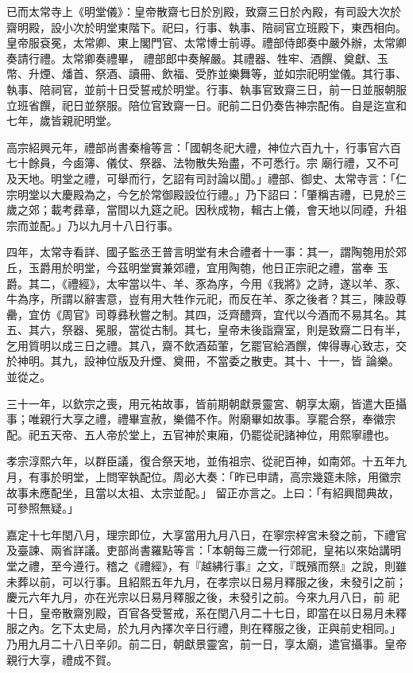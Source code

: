 \begin{pinyinscope}
 已而太常寺上《明堂儀》：皇帝散齋七日於別殿，致齋三日於內殿，有司設大次於齋明殿，設小次於明堂東階下。祀曰，行事、執事、陪祠官立班殿下，東西相向。皇帝服袞冕，太常卿、東上閣門官、太常博士前導。禮部侍郎奏中嚴外辦，太常卿奏請行禮。太常卿奏禮畢，
 禮部郎中奏解嚴。其禮器、牲牢、酒饌、奠獻、玉幣、升煙、燔首、祭酒、讀冊、飲福、受胙並樂舞等，並如宗祀明堂儀。其行事、執事、陪祠官，並前十日受誓戒於明堂。行事、執事官致齋三日，前一日並服朝服立班省饌，祀日並祭服。陪位官致齋一日。祀前二日仍奏告神宗配侑。自是迄宣和七年，歲皆親祀明堂。



 高宗紹興元年，禮部尚書秦檜等言：「國朝冬祀大禮，神位六百九十，行事官六百七十餘員，今鹵簿、儀仗、祭器、法物散失殆盡，不可悉行。宗
 廟行禮，又不可及天地。明堂之禮，可舉而行，乞詔有司討論以聞。」禮部、御史、太常寺言：「仁宗明堂以大慶殿為之，今乞於常御殿設位行禮。」乃下詔曰：「肇稱吉禮，已見於三歲之郊；載考彞章，當間以九筵之祀。因秋成物，輯古上儀，會天地以同禋，升祖宗而並配。」乃以九月十八日行事。



 四年，太常寺看詳、國子監丞王普言明堂有未合禮者十一事：其一，謂陶匏用於郊丘，玉爵用於明堂，今茲明堂實兼郊禮，宜用陶匏，他日正宗祀之禮，當奉
 玉爵。其二，《禮經》，太牢當以牛、羊、豕為序，今用《我將》之詩，遂以羊、豕、牛為序，所謂以辭害意，豈有用大牲作元祀，而反在羊、豕之後者？其三，陳設尊罍，宜仿《周官》司尊彞秋嘗之制。其四，泛齊醴齊，宜代以今酒而不易其名。其五、其六，祭器、冕服，當從古制。其七，皇帝未後詣齋室，則是致齋二日有半，乞用質明以成三日之禮。其八，齋不飲酒茹葷，乞罷官給酒饌，俾得專心致志，交於神明。其九，設神位版及升煙、奠冊，不當委之散吏。其十、十一，皆
 論樂。並從之。



 三十一年，以欽宗之喪，用元祐故事，皆前期朝獻景靈宮、朝享太廟，皆遣大臣攝事；唯親行大享之禮，禮畢宣赦，樂備不作。附廟畢如故事。享罷合祭，奉徽宗配。祀五天帝、五人帝於堂上，五官神於東廂，仍罷從祀諸神位，用熙寧禮也。



 孝宗淳熙六年，以群臣議，復合祭天地，並侑祖宗、從祀百神，如南郊。十五年九月，有事於明堂，上問宰執配位。周必大奏：「昨已申請，高宗幾筵未除，用徽宗故事未應配坐，且當以太祖、太宗並配。」
 留正亦言之。上曰：「有紹興間典故，可參照無疑。」



 嘉定十七年閏八月，理宗即位，大享當用九月八日，在寧宗梓宮未發之前，下禮官及臺諫、兩省詳議。吏部尚書羅點等言：「本朝每三歲一行郊祀，皇祐以來始講明堂之禮，至今遵行。稽之《禮經》，有『越紼行事』之文，『既殯而祭』之說，則雖未葬以前，可以行事。且紹熙五年九月，在孝宗以日易月釋服之後，未發引之前；慶元六年九月，亦在光宗以日易月釋服之後，未發引之前。今來九月八日，前
 祀十日，皇帝散齋別殿，百官各受誓戒，系在閏八月二十七日，即當在以日易月未釋服之內。乞下太史局，於九月內擇次辛日行禮，則在釋服之後，正與前史相同。」乃用九月二十八日辛卯。前二日，朝獻景靈宮，前一日，享太廟，遣官攝事。皇帝親行大享，禮成不賀。




\end{pinyinscope}
